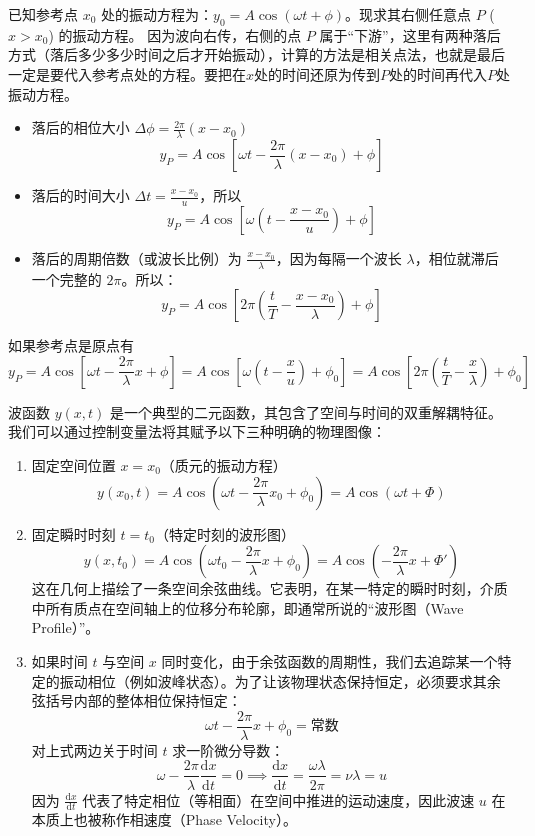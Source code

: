 \begin{theorem}[平面简谐波函数推导]
已知参考点 $x_0$ 处的振动方程为：$y_0 = A \cos(\omega t + \phi)$。现求其右侧任意点 $P$ ($x > x_0$) 的振动方程。
因为波向右传，右侧的点 $P$ 属于“下游”，这里有两种落后方式（落后多少多少时间之后才开始振动），计算的方法是相关点法，也就是最后一定是要代入参考点处的方程。要把在$x$处的时间还原为传到$P$处的时间再代入$P$处振动方程。
\begin{itemize}
\item 落后的相位大小 $\Delta \phi = \frac{2\pi}{\lambda}(x - x_0)$\[y_P = A \cos \left[ \omega t - \frac{2\pi}{\lambda}(x - x_0) + \phi \right]\]
\item 落后的时间大小 $\Delta t = \frac{x - x_0}{u}$，所以\[y_P = A \cos \left[ \omega \left( t - \frac{x - x_0}{u} \right) + \phi \right]\]
\item 落后的周期倍数（或波长比例）为 $\frac{x - x_0}{\lambda}$，因为每隔一个波长 $\lambda$，相位就滞后一个完整的 $2\pi$。所以：$$\boxed{y_P = A \cos \left[ 2\pi \left( \frac{t}{T} - \frac{x-x_0}{\lambda} \right) + \phi \right]}$$
\end{itemize}
如果参考点是原点有$$y_P = A \cos \left[ \omega t - \frac{2\pi}{\lambda}x + \phi \right]= A \cos \left[ \omega \left( t - \frac{x}{u} \right) + \phi_0 \right]=A \cos \left[ 2\pi \left( \frac{t}{T} - \frac{x}{\lambda} \right) + \phi_0 \right]$$
\end{theorem}
波函数 $y(x,t)$ 是一个典型的二元函数，其包含了空间与时间的双重解耦特征。我们可以通过控制变量法将其赋予以下三种明确的物理图像：
\begin{enumerate}
    \item 固定空间位置 $x = x_0$（质元的振动方程）$$y(x_0, t) = A \cos \left( \omega t - \frac{2\pi}{\lambda}x_0 + \phi_0 \right) = A \cos (\omega t + \Phi)$$
    \item 固定瞬时时刻 $t = t_0$（特定时刻的波形图）$$y(x, t_0) = A \cos \left( \omega t_0 - \frac{2\pi}{\lambda}x + \phi_0 \right) = A \cos \left( -\frac{2\pi}{\lambda}x + \Phi' \right)$$这在几何上描绘了一条空间余弦曲线。它表明，在某一特定的瞬时时刻，介质中所有质点在空间轴上的位移分布轮廓，即通常所说的“波形图（Wave Profile）”。
    \item 如果时间 $t$ 与空间 $x$ 同时变化，由于余弦函数的周期性，我们去追踪某一个特定的振动相位（例如波峰状态）。为了让该物理状态保持恒定，必须要求其余弦括号内部的整体相位保持恒定：$$\omega t - \frac{2\pi}{\lambda}x + \phi_0 = \text{常数}$$对上式两边关于时间 $t$ 求一阶微分导数：$$\omega - \frac{2\pi}{\lambda} \frac{\mathrm{d}x}{\mathrm{d}t} = 0 \implies \frac{\mathrm{d}x}{\mathrm{d}t} = \frac{\omega \lambda}{2\pi} = \nu \lambda = u$$因为 $\frac{\mathrm{d}x}{\mathrm{d}t}$ 代表了特定相位（等相面）在空间中推进的运动速度，因此波速 $u$ 在本质上也被称作相速度（Phase Velocity）。
\end{enumerate}

